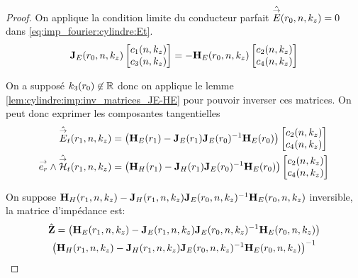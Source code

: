     \begin{proof}
      On applique la condition limite du conducteur parfait \(\hat {{\overset{\rightarrow}{E}}}(r_0,n,k_z) = 0\) dans \eqref{eq:imp_fourier:cylindre:Et}.
      \begin{equation}
        \mathbf{J}_{E}(r_0,n,k_z)
        \begin{bmatrix}
          c_1(n,k_z) \\
          c_3(n,k_z)
        \end{bmatrix}
        =-\mathbf{H}_{E}(r_0,n,k_z)
        \begin{bmatrix}
          c_2(n,k_z) \\
          c_4(n,k_z)
        \end{bmatrix}
      \end{equation}

      On a supposé \(k_3(r_0)\not \in \mathbb R \) donc on applique le lemme \ref{lem:cylindre:imp:inv_matrices_JE-HE} pour pouvoir inverser ces matrices.
      On peut donc exprimer les composantes tangentielles
      \begin{align}
        \hat {{\overset{\rightarrow}{E}}}_t(r_1,n,k_z) &=
        \left(\mathbf{H}_{E}(r_1) - \mathbf{J}_{E}(r_1)\mathbf{J}_{E}(r_0)^{-1}\mathbf{H}_{E}(r_0)\right)
        \begin{bmatrix}
          c_2(n,k_z) \\
          c_4(n,k_z)
        \end{bmatrix}
        \\
        {\overset{\rightarrow}{e_r}}\wedge \hat {{\overset{\rightarrow}{\mathcal{H}}}}_t(r_1,n,k_z) &=
        \left(\mathbf{H}_{H}(r_1) - \mathbf{J}_{H}(r_1)\mathbf{J}_{E}(r_0)^{-1}\mathbf{H}_{E}(r_0) \right)
        \begin{bmatrix}
          c_2(n,k_z) \\
          c_4(n,k_z)
        \end{bmatrix}
      \end{align}

      On suppose \(\mathbf{H}_{H}(r_1,n,k_z) - \mathbf{J}_{H}(r_1,n,k_z)\mathbf{J}_{E}(r_0,n,k_z)^{-1}\mathbf{H}_{E}(r_0,n,k_z)\) inversible, la matrice d'impédance est:
      \begin{multline}
        \hat {\mathbf{Z}} =
        \left(\mathbf{H}_{E}(r_1,n,k_z) - \mathbf{J}_{E}(r_1,n,k_z)\mathbf{J}_{E}(r_0,n,k_z)^{-1}\mathbf{H}_{E}(r_0,n,k_z)\right)
        \\
        \left(\mathbf{H}_{H}(r_1,n,k_z) - \mathbf{J}_{H}(r_1,n,k_z)\mathbf{J}_{E}(r_0,n,k_z)^{-1}\mathbf{H}_{E}(r_0,n,k_z)\right)^{-1}
      \end{multline}


\end{proof}
